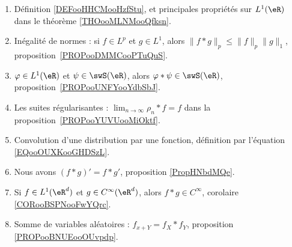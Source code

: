 \begin{enumerate}
	\item
	      Définition \ref{DEFooHHCMooHzfStu}, et principales propriétés sur \( L^1(\eR)\) dans le théorème \ref{THOooMLNMooQfksn}.
	\item
	      Inégalité de normes : si \( f\in L^p\) et \( g\in L^1\), alors \( \| f*g \|_p\leq \| f \|_p\| g \|_1\), proposition~\ref{PROPooDMMCooPTuQuS}.
	\item
	      \( \varphi\in L^1(\eR)\) et \( \psi\in\swS(\eR)\), alors \( \varphi * \psi\in \swS(\eR)\), proposition~\ref{PROPooUNFYooYdbSbJ}.
	\item
	      Les suites régularisantes : \( \lim_{n\to \infty} \rho_n*f=f\) dans la proposition~\ref{PROPooYUVUooMiOktf}.
	\item
	      Convolution d'une distribution par une fonction, définition par l'équation \eqref{EQooOUXKooGHDSzL}.
	\item
	      Nous avons \( (f*g)'=f*g'\), proposition \ref{PropHNbdMQe}.
	\item
        Si \( f\in L^1(\eR^d)\) et \( g\in C^{\infty}(\eR^d)\), alors \( f*g\in C^{\infty}\), corolaire \ref{CORooBSPNooFwYQrc}.
	\item
	      Somme de variables aléatoires : \( f_{x+Y}=f_X*f_Y\), proposition \ref{PROPooBNUEooOUvpdp}.
\end{enumerate}
